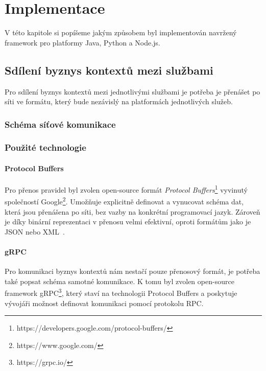 \usepackage[T1]{fontenc}
\usepackage[utf8]{inputenc}


\chapter{Implementace}\label{ch:implementace}

V této kapitole si popíšeme jakým způsobem byl implementován
navržený framework pro platformy Java, Python a Node.js.

\section{Sdílení byznys kontextů mezi službami}

Pro sdílení byznys kontextů mezi jednotlivými službami
je potřeba je přenášet po síti ve formátu, který bude
nezávislý na platformách jednotlivých služeb.

\subsection{Schéma síťové komunikace}

\subsection{Použité technologie}

\subsubsection{Protocol Buffers}

Pro přenos pravidel byl zvolen open-source formát
\textit{Protocol Buffers}\footnote{
https://developers.google.com/protocol-buffers/
}
vyvinutý společností Google\footnote{
https://www.google.com/
}. Umožňuje explicitně definovat a vynucovat schéma dat,
která jsou přenášena po síti, bez vazby na konkrétní programovací
jazyk. Zároveň je díky binární reprezentaci v přenosu velmi efektivní,
oproti formátům jako je JSON nebo XML~\cite{varda2008protocol}.


\subsubsection{gRPC}

Pro komunikaci byznys kontextů nám nestačí pouze přenosový formát,
je potřeba také popsat schéma samotné komunikace. K tomu byl zvolen
open-source framework gRPC\footnote{
https://grpc.io/
}, který staví na technologii Protocol Buffers a poskytuje vývojáři
možnost definovat komunikaci pomocí protokolu RPC.

